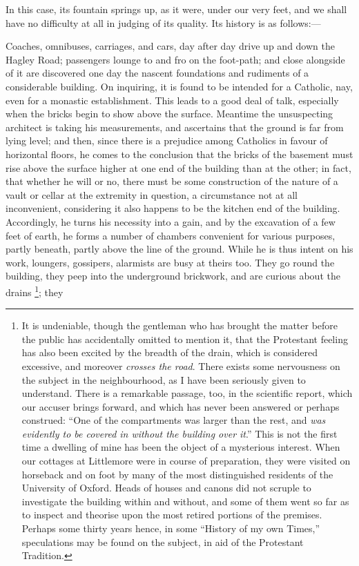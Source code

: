 In this case, its fountain springs up, as it were,
under our very feet, and we shall have no difficulty at
all in judging of its quality. Its history is as
follows:—

Coaches, omnibuses, carriages, and cars, day after day
drive up and down the Hagley Road; passengers lounge to
and fro on the foot-path; and close alongside of it are
discovered one day the nascent foundations and rudiments
of a considerable building. On inquiring, it is found to
be intended for a Catholic, nay, even for a monastic
establishment. This leads to a good deal of talk,
especially when the bricks begin to show above the
surface. Meantime the unsuspecting architect is taking
his measurements, and ascertains that the ground is far
from lying level; and then, since there is a prejudice
among Catholics in favour of horizontal floors, he comes
to the conclusion that the bricks of the basement must
rise above the surface higher at one end of the building
than at the other; in fact, that whether he will or no,
there must be some construction of the nature of a vault
or cellar at the extremity in question, a circumstance
not at all inconvenient, considering it also happens to
be the kitchen end of the building. Accordingly, he turns
his necessity into a gain, and by the excavation of a few
feet of earth, he forms a number of chambers convenient
for various purposes, partly beneath, partly above the
line of the ground. While he is thus intent on his work,
loungers, gossipers, alarmists are busy at theirs too.
They go round the building, they peep into the
underground brickwork, and are curious about the drains
\footnote{It is undeniable, though the
gentleman who has brought the matter before the public
has accidentally omitted to mention it, that the
Protestant feeling has also been excited by the breadth
of the drain, which is considered excessive, and moreover \emph{crosses the road}. There exists some nervousness on the
subject in the neighbourhood, as I have been seriously
given to understand. There is a remarkable passage, too,
in the scientific report, which our accuser brings
forward, and which has never been answered or perhaps
construed: ``One of the compartments was larger than
the rest, and \emph{was evidently to be covered in without the
building over it}.'' This is not the first time a
dwelling of mine has been the object of a mysterious
interest. When our cottages at Littlemore were in course
of preparation, they were visited on horseback and on
foot by many of the most distinguished residents of the
University of Oxford. Heads of houses and canons did not
scruple to investigate the building within and without,
and some of them went so far as to inspect and theorise
upon the most retired portions of the premises. Perhaps
some thirty years hence, in some ``History of my own
Times,'' speculations may be found on the subject, in
aid of the Protestant Tradition.}; they
